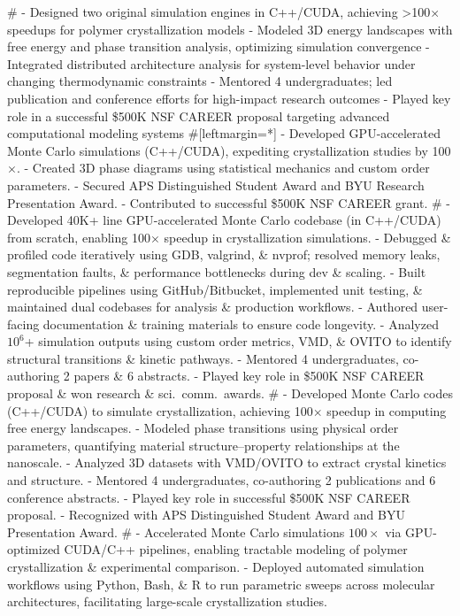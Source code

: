 #
- Designed two original simulation engines in C++/CUDA, achieving >100$\times$ speedups for polymer crystallization models  
- Modeled 3D energy landscapes with free energy and phase transition analysis, optimizing simulation convergence  
- Integrated distributed architecture analysis for system-level behavior under changing thermodynamic constraints  
- Mentored 4 undergraduates; led publication and conference efforts for high-impact research outcomes  
- Played key role in a successful \$500K NSF CAREER proposal targeting advanced computational modeling systems  
#[leftmargin=*]
- Developed GPU-accelerated Monte Carlo simulations (C++/CUDA), expediting crystallization studies by 100$\times$.
- Created 3D phase diagrams using statistical mechanics and custom order parameters.
- Secured APS Distinguished Student Award and BYU Research Presentation Award.
- Contributed to successful \$500K NSF CAREER grant.
#
- Developed 40K+ line GPU-accelerated Monte Carlo codebase (in C++/CUDA) from scratch, enabling 100$\times$ speedup in crystallization simulations.
- Debugged \& profiled code iteratively using GDB, valgrind, \& nvprof; resolved memory leaks, segmentation faults, \& performance bottlenecks during dev \& scaling.
- Built reproducible pipelines using GitHub/Bitbucket, implemented unit testing, \& maintained dual codebases for analysis \& production workflows.
- Authored user-facing documentation \& training materials to ensure code longevity.
- Analyzed $10^6$+ simulation outputs using custom order metrics, VMD, \& OVITO to identify structural transitions \& kinetic pathways.
- Mentored 4 undergraduates, co-authoring 2 papers \& 6 abstracts.
- Played key role in \$500K NSF CAREER proposal \& won research \& sci.~comm.~awards.
#
- Developed Monte Carlo codes (C++/CUDA) to simulate crystallization, achieving 100$\times$ speedup in computing free energy landscapes.
- Modeled phase transitions using physical order parameters, quantifying material structure–property relationships at the nanoscale.
- Analyzed 3D datasets with VMD/OVITO to extract crystal kinetics and structure.
- Mentored 4 undergraduates, co-authoring 2 publications and 6 conference abstracts.
- Played key role in successful \$500K NSF CAREER proposal.
- Recognized with APS Distinguished Student Award and BYU Presentation Award.
#
- Accelerated Monte Carlo simulations $100\times$ via GPU-optimized CUDA/C++ pipelines, enabling tractable modeling of polymer crystallization \& experimental comparison.
- Deployed automated simulation workflows using Python, Bash, \& R to run parametric sweeps across molecular architectures, facilitating large-scale crystallization studies.
